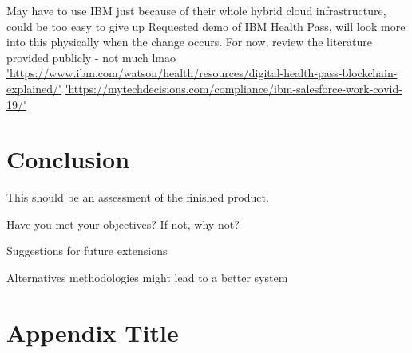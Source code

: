 \documentclass{report}
\begin{document}
\begin{flushleft}
May have to use IBM just because of their whole hybrid cloud infrastructure, could be too easy to give up \cite{noauthor_ibm_2020}
\linebreak[1]
Requested demo of IBM Health Pass, will look more into this physically when the change occurs. For now, review the literature provided publicly - not much lmao \url{'https://www.ibm.com/watson/health/resources/digital-health-pass-blockchain-explained/'}
\url{'https://mytechdecisions.com/compliance/ibm-salesforce-work-covid-19/'}

\chapter{Conclusion}
This should be an assessment of the finished product.

Have you met your objectives? If not, why not?

Suggestions for future extensions

Alternatives methodologies might lead to a better system

\appendix
\chapter{Appendix Title}



\end{flushleft}

\printbibliography
\end{document}
